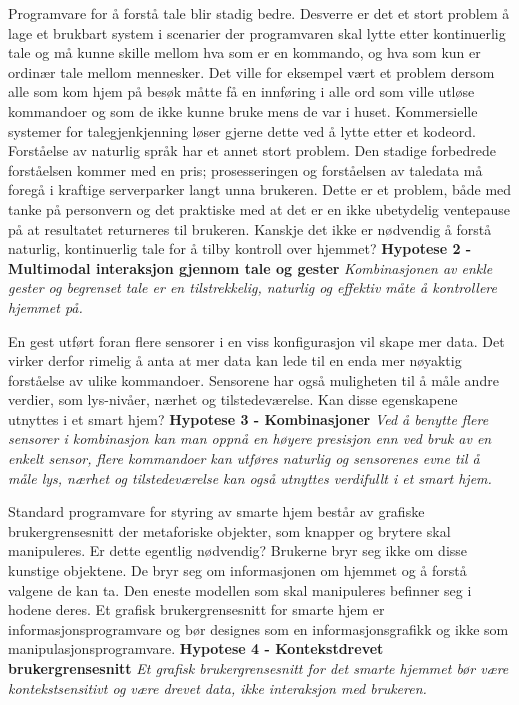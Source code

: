 Programvare for å forstå tale blir stadig bedre. Desverre er det et stort problem å lage et brukbart system i scenarier der programvaren skal lytte etter kontinuerlig tale og må kunne skille mellom hva som er en kommando, og hva som kun er ordinær tale mellom mennesker. Det ville for eksempel vært et problem dersom alle som kom hjem på besøk måtte få en innføring i alle ord som ville utløse kommandoer og som de ikke kunne bruke mens de var i huset. Kommersielle systemer for talegjenkjenning løser gjerne dette ved å lytte etter et kodeord. Forståelse av naturlig språk har et annet stort problem. Den stadige forbedrede forståelsen kommer med en pris; prosesseringen og forståelsen av taledata må foregå i kraftige serverparker langt unna brukeren. Dette er et problem, både med tanke på personvern og det praktiske med at det er en ikke ubetydelig ventepause på at resultatet returneres til brukeren. Kanskje det ikke er nødvendig å forstå naturlig, kontinuerlig tale for å tilby kontroll over hjemmet? \newline\newline
\textbf{Hypotese 2 - Multimodal interaksjon gjennom tale og gester}\newline
\emph{Kombinasjonen av enkle gester og begrenset tale er en tilstrekkelig, naturlig og effektiv måte å kontrollere hjemmet på.}\newline

En gest utført foran flere sensorer i en viss konfigurasjon vil skape mer data. Det virker derfor rimelig å anta at mer data kan lede til en enda mer nøyaktig forståelse av ulike kommandoer. Sensorene har også muligheten til å måle andre verdier, som lys-nivåer, nærhet og tilstedeværelse. Kan disse egenskapene utnyttes i et smart hjem?\newline\newline
\textbf{Hypotese 3 - Kombinasjoner}\newline
\emph{Ved å benytte flere sensorer i kombinasjon kan man oppnå en høyere presisjon enn ved bruk av en enkelt sensor, flere kommandoer kan utføres naturlig og sensorenes evne til å måle lys, nærhet og tilstedeværelse kan også utnyttes verdifullt i et smart hjem.}\newline

Standard programvare for styring av smarte hjem består av  grafiske brukergrensesnitt der metaforiske objekter, som knapper og brytere skal manipuleres. Er dette egentlig nødvendig? Brukerne bryr seg ikke om disse kunstige objektene. De bryr seg om informasjonen om hjemmet og å forstå valgene de kan ta. Den eneste modellen som skal manipuleres befinner seg i hodene deres. Et grafisk brukergrensesnitt for smarte hjem er informasjonsprogramvare og bør designes som en informasjonsgrafikk og ikke som manipulasjonsprogramvare.\newline\newline
\textbf{Hypotese 4 - Kontekstdrevet brukergrensesnitt}\newline
\emph{Et grafisk brukergrensesnitt for det smarte hjemmet bør være kontekstsensitivt og være drevet data, ikke interaksjon med brukeren.}\newline




